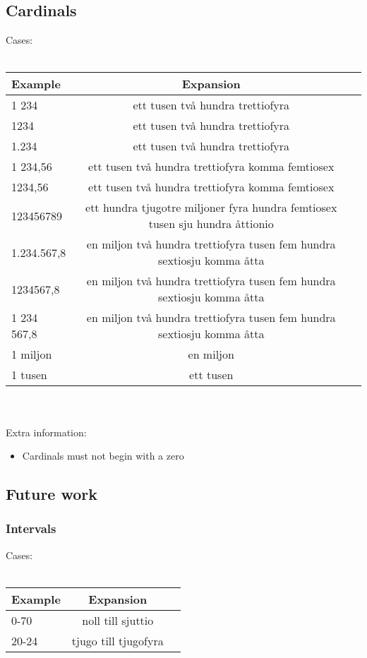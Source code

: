 \documentclass[10pt,a4paper]{article}
\begin{document}
\subsection{Cardinals}
Cases:\\
\\
\begin{tabular}{|l|c|r|}\hline
  Example & Expansion \\ \hline
  1 234 & ett tusen två hundra trettiofyra\\
  1234 & ett tusen två hundra trettiofyra\\
  1.234 & ett tusen två hundra trettiofyra\\
  1 234,56 & ett tusen två hundra trettiofyra komma femtiosex\\
  1234,56 & ett tusen två hundra trettiofyra komma femtiosex\\
  123456789 & ett hundra tjugotre miljoner fyra hundra femtiosex tusen sju hundra åttionio \\
  1.234.567,8 & en miljon två hundra trettiofyra tusen fem hundra sextiosju komma åtta\\
  1234567,8 & en miljon två hundra trettiofyra tusen fem hundra sextiosju komma åtta\\
  1 234 567,8 & en miljon två hundra trettiofyra tusen fem hundra sextiosju komma åtta\\
  1 miljon & en miljon \\
  1 tusen & ett tusen \\\hline
\end{tabular}
\\
\\
Extra information:
\begin{itemize}
  \item Cardinals must not begin with a zero
\end{itemize}

\subsection{Future work}
\subsubsection{Intervals}
Cases:\\
\\
\begin{tabular}{|l|c|r|}\hline
  Example & Expansion \\ \hline
  0-70 & noll till sjuttio \\
  20-24 & tjugo till tjugofyra \\\hline  
\end{tabular}
\end{document}
